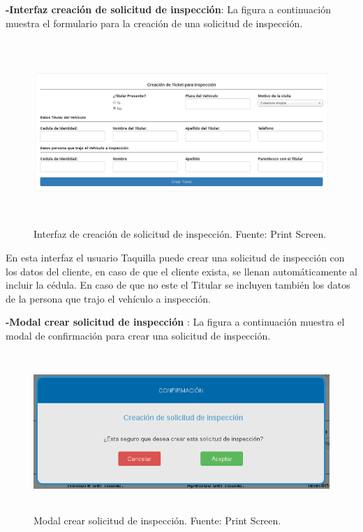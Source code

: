 \textbf{-Interfaz creación de solicitud de inspección}: La figura a continuación muestra el formulario para la creación de una solicitud de inspección.

\begin{figure}[H]
\begin{center}
	\includegraphics[width=\textwidth,height=7cm]{img/interfaces/crear_ticket_solicitud.png}
\end{center}
\caption{Interfaz de creación de solicitud de inspección. Fuente: Print Screen.}
\label{fig:interfaz_crear_solicitud_inspeccion}
\end{figure}

En esta interfaz el usuario Taquilla puede crear una solicitud de inspección con los datos del cliente, en caso de que el cliente exista, se llenan automáticamente al incluir la cédula. En caso de que no este el Titular se incluyen también los datos de la persona que trajo el vehículo a inspección.

\newpage
\textbf{-Modal crear solicitud de inspección }: La figura a continuación muestra el modal de confirmación para crear una solicitud de inspección.

\begin{figure}[H]
\begin{center}
	\includegraphics[width=14cm,height=6cm]{img/interfaces/modal_confirmar_creacion_solicitud.png}
\end{center}
\caption{Modal crear solicitud de inspección. Fuente: Print Screen.}
\label{fig:modal_confirmacion_crear_solicitud}
\end{figure}



